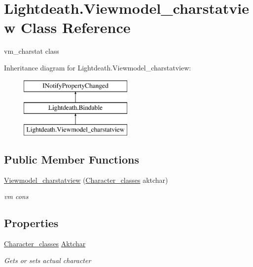 \hypertarget{class_lightdeath_1_1_viewmodel__charstatview}{}\section{Lightdeath.\+Viewmodel\+\_\+charstatview Class Reference}
\label{class_lightdeath_1_1_viewmodel__charstatview}


vm\+\_\+charstat class  


Inheritance diagram for Lightdeath.\+Viewmodel\+\_\+charstatview\+:\begin{figure}[H]
\begin{center}
\leavevmode
\includegraphics[height=3.000000cm]{class_lightdeath_1_1_viewmodel__charstatview}
\end{center}
\end{figure}
\subsection*{Public Member Functions}
\begin{DoxyCompactItemize}
\item 
\hyperlink{class_lightdeath_1_1_viewmodel__charstatview_a784847691e63627f73f804f03f3ef677}{Viewmodel\+\_\+charstatview} (\hyperlink{class_lightdeath_1_1_character__classes}{Character\+\_\+classes} aktchar)
\begin{DoxyCompactList}\small\item\em vm cons \end{DoxyCompactList}\end{DoxyCompactItemize}
\subsection*{Properties}
\begin{DoxyCompactItemize}
\item 
\hyperlink{class_lightdeath_1_1_character__classes}{Character\+\_\+classes} \hyperlink{class_lightdeath_1_1_viewmodel__charstatview_a90dea691e5d3a1ae007bec7f4fa581fe}{Aktchar}
\begin{DoxyCompactList}\small\item\em Gets or sets actual character \end{DoxyCompactList}\end{DoxyCompactItemize}
